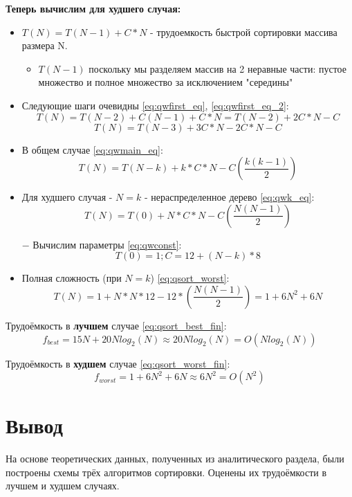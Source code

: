 \textbf{Теперь вычислим для худшего случая:}
\begin{itemize}
    \item $T(N) = T(N - 1) + C*N$ - трудоемкость быстрой сортировки массива размера N.
    \begin{itemize}
        \item $T(N - 1)$ поскольку мы разделяем массив на 2 неравные части: пустое множество и полное множество за исключением "середины"
    \end{itemize}
    \item Следующие шаги очевидны \eqref{eq:qwfirst_eq}, \eqref{eq:qwfirst_eq_2}:
    \begin{equation}
        \label{eq:qwfirst_eq}
        T(N) = T(N-2) + C(N-1) + C*N =  T(N-2) + 2C*N - C
    \end{equation}
    \begin{equation}
        \label{eq:qwfirst_eq_2}
        T(N) = T(N-3) + 3C*N - 2C*N - C
    \end{equation}
    \item В общем случае \eqref{eq:qwmain_eq}:
    \begin{equation}
        \label{eq:qwmain_eq}
        T(N) = T(N-k) + k*C*N - C(\frac{k(k-1)}{2})
    \end{equation}
    \item Для худшего случая - $N = k$ - нераспределенное дерево \eqref{eq:qwk_eq}:
    \begin{equation}
        \label{eq:qwk_eq}
        T(N) = T(0) + N*C*N - C(\frac{N(N-1)}{2})
    \end{equation}
    \item[$-$] Вычислим параметры \eqref{eq:qwconst}:
    \begin{equation}
        \label{eq:qwconst}
        T(0) = 1;
        C = 12 + (N-k) * 8
    \end{equation}
    \item Полная сложность (при $N = k$) \eqref{eq:qsort_worst}:
    \begin{equation}
        \label{eq:qsort_worst}
        T(N) = 1 + N*N*12 - 12*(\frac{N(N-1)}{2}) = 1 + 6N^2 + 6N
    \end{equation}
\end{itemize}

Трудоёмкость в \textbf{лучшем} случае \eqref{eq:qsort_best_fin}:
\begin{equation}
    \label{eq:qsort_best_fin}
    f_{best} = 15N + 20Nlog_2(N) \approx 20Nlog_2(N) = O(Nlog_2(N))
\end{equation}

Трудоёмкость в \textbf{худшем} случае \eqref{eq:qsort_worst_fin}:
\begin{equation}
    \label{eq:qsort_worst_fin}
    f_{worst} = 1 + 6N^2 + 6N \approx 6N^2 = O(N^{2})
\end{equation}
\section*{Вывод}

На основе теоретических данных, полученных из аналитического раздела, были построены схемы трёх алгоритмов сортировки.
Оценены их трудоёмкости в лучшем и худшем случаях.

\clearpage

